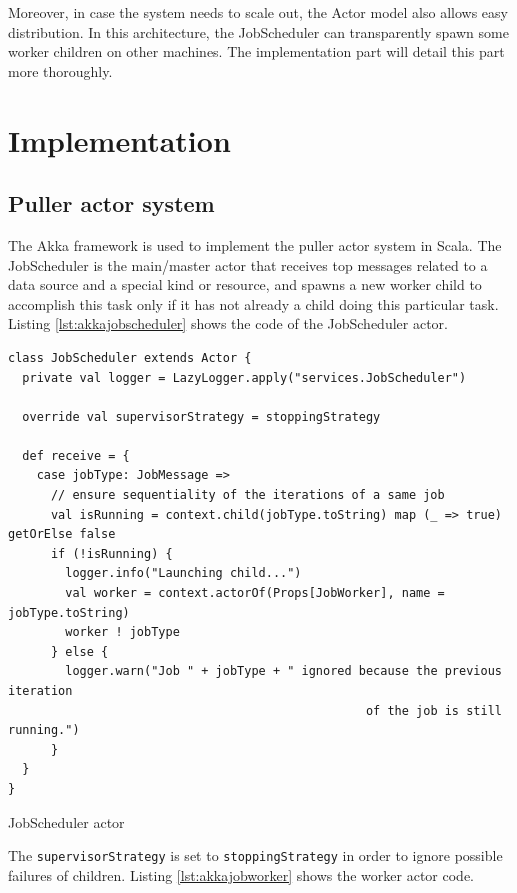 Moreover, in case the system needs to scale out, the Actor model also allows easy distribution. In this architecture, the JobScheduler can transparently spawn some worker children on other machines. The implementation part will detail this part more thoroughly.


\section{Implementation}

\subsection{Puller actor system}

The Akka framework is used to implement the puller actor system in Scala. The JobScheduler is the main/master actor that receives top messages related to a data source and a special kind or resource, and spawns a new worker child to accomplish this task only if it has not already a child doing this particular task. Listing \ref{lst:akkajobscheduler} shows the code of the JobScheduler actor.

\begin{listing}[h]
\begin{verbatim}
class JobScheduler extends Actor {
  private val logger = LazyLogger.apply("services.JobScheduler")

  override val supervisorStrategy = stoppingStrategy
  
  def receive = {
    case jobType: JobMessage =>
      // ensure sequentiality of the iterations of a same job
      val isRunning = context.child(jobType.toString) map (_ => true) getOrElse false
      if (!isRunning) {
        logger.info("Launching child...")
        val worker = context.actorOf(Props[JobWorker], name = jobType.toString)
        worker ! jobType
      } else {
        logger.warn("Job " + jobType + " ignored because the previous iteration 
                                                  of the job is still running.")
      }
  }
}
\end{verbatim}
\caption{JobScheduler actor}
\label{lst:akkajobscheduler}
\end{listing}

The \verb|supervisorStrategy| is set to \verb|stoppingStrategy| in order to ignore possible failures of children. Listing \ref{lst:akkajobworker} shows the worker actor code.

